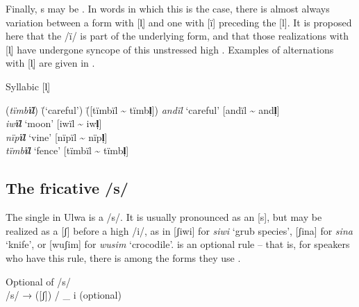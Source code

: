 
Finally, s may be . In words in which this is the case, there is almost always variation between a form with  [l̩] and one with [ï] preceding the  [l]. It is proposed here that the  /ï/ is part of the underlying form, and that those realizations with  [l̩] have undergone syncope of this unstressed high . Examples of alternations with  [l̩] are given in .


\ea%
    \label{ex:phon:33}
          Syllabic [l̩]\\
\begin{tabbing}
{(\textit{tïmb\textbf{ïl}})} \= {(‘careful’)} \= {([tïmbïl {\textasciitilde} tïmb\textbf{l̩}])}\kill
{\textit{andïl}} \> {‘careful’} \> {[andïl {\textasciitilde} and\textbf{l̩}]}\\
{\textit{iw\textbf{ïl}}} \> {‘moon’} \> {[iwïl {\textasciitilde} iw\textbf{l̩}]}\\
{\textit{nïp\textbf{ïl}}} \> {‘vine’} \> {[nïpïl {\textasciitilde} nïp\textbf{l̩}]}\\
{\textit{tïmb\textbf{ïl}}} \> {‘fence’} \> {[tïmbïl {\textasciitilde} tïmb\textbf{l̩}]}
\end{tabbing}
\z


\subsection{The fricative /s/}\label{sec:2.1.6}


The single  in Ulwa is a    /s/. It is usually pronounced as an   [s], but may be realized as a   [ʃ] before a  high  /i/, as in [ʃiwi] for \textit{siwi} ‘grub species’, [ʃina] for \textit{sina} ‘knife’, or [wuʃim] for \textit{wusim} ‘crocodile’.  is an optional rule – that is, for speakers who have this rule, there is  among the forms they use .

\ea%
    \label{ex:phon:34}
          Optional  of /s/\\
    /s/ → ([ʃ]) / \_ i (optional)
\z

